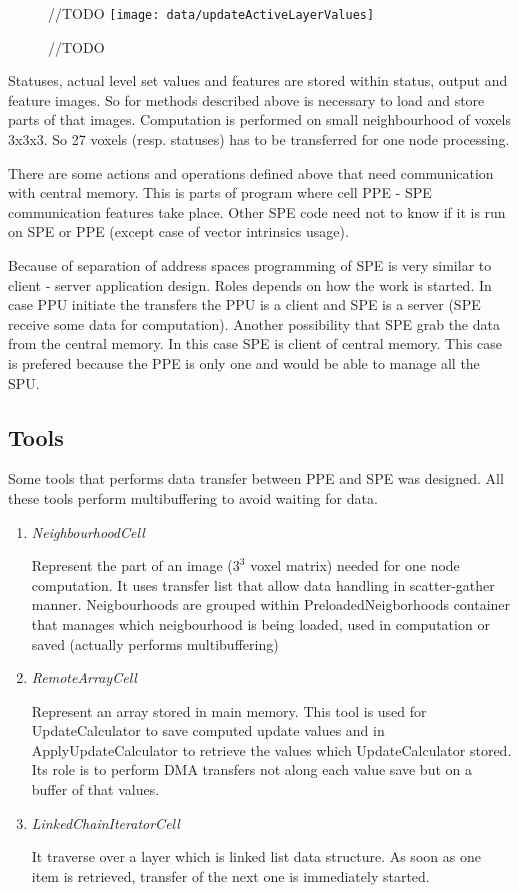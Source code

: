 \begin{figure}	//TODO
    \centering
    \texttt{[image: data/updateActiveLayerValues]}
    \caption[Diagram of new design components]{//TODO}
    \label{fg:updateActiveLayerValues}
\end{figure}

Statuses, actual level set values and features are stored within status, output and feature images.
So for methods described above is necessary to load and store parts of that images.
Computation is performed on small neighbourhood of voxels 3x3x3.
So 27 voxels (resp. statuses) has to be transferred for one node processing.

There are some actions and operations defined above that need communication with central memory.
This is parts of program where cell PPE - SPE communication features take place.
Other SPE code need not to know if it is run on SPE or PPE (except case of vector intrinsics usage).

Because of separation of address spaces programming of SPE is very similar to client - server application design.
Roles depends on how the work is started.
In case PPU initiate the transfers the PPU is a client and SPE is a server (SPE receive some data for computation).
Another possibility that SPE grab the data from the central memory.
In this case SPE is client of central memory.
This case is prefered because the PPE is only one and would be able to manage all the SPU.

\subsection{Tools}
Some tools that performs data transfer between PPE and SPE was designed.
All these tools perform multibuffering to avoid waiting for data.

\begin{enumerate}
\item \emph{NeighbourhoodCell}
\par
Represent the part of an image ($3^3$ voxel matrix) needed for one node computation.
It uses transfer list that allow data handling in scatter-gather manner.
Neigbourhoods are grouped within PreloadedNeigborhoods container that manages which neigbourhood is being loaded, used in computation or saved (actually performs multibuffering)

\item \emph{RemoteArrayCell}
\par
Represent an array stored in main memory.
This tool is used for UpdateCalculator to save computed update values and in ApplyUpdateCalculator to retrieve the values which UpdateCalculator stored.
Its role is to perform DMA transfers not along each value save but on a buffer of that values.

\item \emph{LinkedChainIteratorCell}
\par
It traverse over a layer which is linked list data structure.
As soon as one item is retrieved, transfer of the next one is immediately started.
\end{enumerate}

